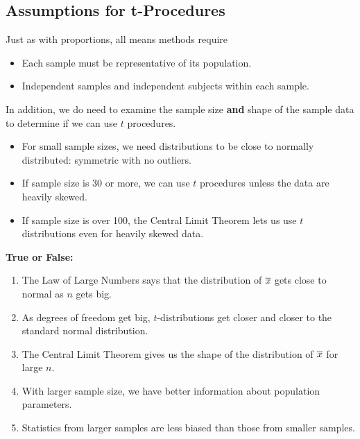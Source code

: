 

\subsection{ Assumptions for t-Procedures}


  Just as with proportions, all means methods require 
  \begin{itemize}
     \item Each sample must be representative of its population. 
     \item Independent samples and independent subjects within each
       sample.
  \end{itemize}
   In addition, we do need to examine the sample size {\bf and} shape
   of the sample data to determine if we can use $t$ procedures.
   \begin{itemize}
   \item For small sample sizes, we need distributions to be close to
     normally distributed: symmetric with no outliers.
   \item If sample size is 30 or more, we can use $t$ procedures
     unless the data are heavily skewed.
   \item If sample size is over 100, the Central Limit Theorem lets us
     use $t$ distributions even for heavily skewed data.
   \end{itemize}

   \begin{center}
     {\large\bf True or False:}
   \end{center}
   \begin{enumerate}
   \item \underline{\hspace{.5in}} The Law of Large Numbers says that the
     distribution of $\overline{x}$  gets close to normal as $n$ gets big. 
   \item \underline{\hspace{.5in}} As degrees of freedom get big,
     $t$-distributions get 
     closer and closer to the standard normal distribution.
   \item \underline{\hspace{.5in}} The Central Limit Theorem gives us the shape of
     the distribution of $\overline{x}$ for large $n$.
   \item \underline{\hspace{.5in}}  With larger sample size, we have better
     information about population parameters.
   \item \underline{\hspace{.5in}} Statistics from larger samples are less biased
     than those from smaller samples.
   \end{enumerate}

